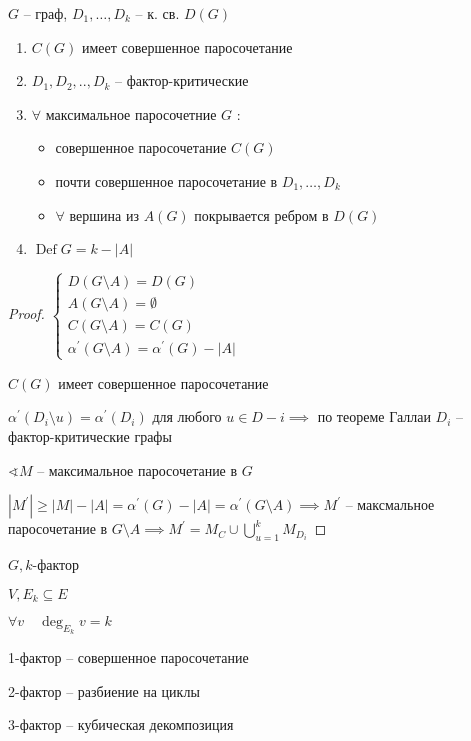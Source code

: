 \documentclass{book}
\renewcommand\O{\ensuremath{\emptyset}}
\newcommand{\p}[1]{#1^{\prime}}
\theoremstyle{definition}
\DeclareMathOperator{\Def}{Def}
\begin{document}
\begin{theorem}

    $G$ -- граф,  $D_1, \ldots, D_k$ -- к. св. $D(G)$
     \begin{enumerate}
         \item $C(G)$ имеет совершенное паросочетание
         \item  $D_1, D_2, .., D_k$ -- фактор-критические
         \item $\forall $ максимальное паросочетние $G$ :
             \begin{itemize}
                 \item совершенное паросочетание $C(G)$
                 \item почти совершенное паросочетание в  $D_1, \ldots, D_k$
                 \item $\forall $ вершина из $A(G)$  покрывается ребром в $D(G)$
             \end{itemize}
         \item $\Def G  = k - |A|$
    \end{enumerate}
\end{theorem}
\begin{proof}
    $\begin{cases}
        D(G\setminus A) = D(G)\\
        A(G\setminus A) = \O \\
        C(G\setminus A) = C(G)\\
        \p\alpha\left( G\setminus A \right)  = \p \alpha(G) - |A|
    \end{cases}$ 

    $C(G)$ имеет совершенное паросочетание

    $\p\alpha(D_i \setminus  u) = \p \alpha(D_i)$ для любого $u\in D-i \implies $ по теореме Галлаи $D_i$ -- фактор-критические графы

     $\sphericalangle M$ -- максимальное паросочетание в $G$

     $\left| \p M \right| \geqslant \left| M \right|  - |A| = \p \alpha(G) - |A| = \p \alpha(G\setminus A) \implies \p M$ -- максмальное паросочетание в $G \setminus A \implies \p M = M_C \cup \bigcup\limits_{u=1}^k M_{D_i}$
\end{proof}

\begin{problem}

    $G, k$-фактор

     $V, E_k\subseteq E$

     $\forall v\quad \deg_{E_k}v = k$

     1-фактор -- совершенное паросочетание

     2-фактор -- разбиение на циклы

     3-фактор -- кубическая декомпозиция
\end{problem}
\end{document}
